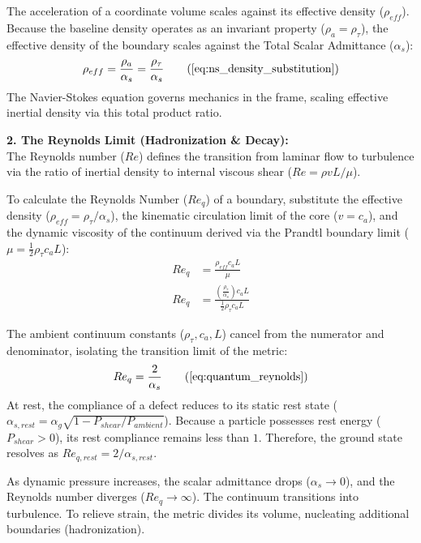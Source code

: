 The acceleration of a coordinate volume scales against its effective density ($\rho_{eff}$). Because the baseline density operates as an invariant property ($\rho_a = \rho_\tau$), the effective density of the boundary scales against the Total Scalar Admittance ($\alpha_s$): %
\begin{equation}
    \rho_{eff} = \frac{\rho_a}{\alpha_s} = \frac{\rho_{\tau}}{\alpha_s} \tag{\ref{eq:ns_density_substitution}}
\end{equation}
The Navier-Stokes equation governs mechanics in the frame, scaling effective inertial density via this total product ratio. %

\textbf{2. The Reynolds Limit (Hadronization \& Decay):} \\
The Reynolds number ($Re$) defines the transition from laminar flow to turbulence via the ratio of inertial density to internal viscous shear ($Re = \rho v L / \mu$). %

To calculate the Reynolds Number ($Re_q$) of a boundary, substitute the effective density ($\rho_{eff} = \rho_\tau/\alpha_s$), the kinematic circulation limit of the core ($v = c_a$), and the dynamic viscosity of the continuum derived via the Prandtl boundary limit ($\mu = \frac{1}{2} \rho_\tau c_a L$): %
\begin{align}
    Re_q &= \frac{\rho_{eff} c_a L}{\mu} \\ 
    Re_q &= \frac{\left( \frac{\rho_\tau}{\alpha_s} \right) c_a L}{\frac{1}{2} \rho_\tau c_a L} 
\end{align}

The ambient continuum constants ($\rho_\tau, c_a, L$) cancel from the numerator and denominator, isolating the transition limit of the metric:
\begin{equation}
    Re_q = \frac{2}{\alpha_s} \tag{\ref{eq:quantum_reynolds}} 
\end{equation}
At rest, the compliance of a defect reduces to its static rest state ($\alpha_{s, rest} = \alpha_g \sqrt{1 - P_{shear}/P_{ambient}}$). Because a particle possesses rest energy ($P_{shear} > 0$), its rest compliance remains less than $1$. Therefore, the ground state resolves as $Re_{q, rest} = 2 / \alpha_{s, rest}$. %

As dynamic pressure increases, the scalar admittance drops ($\alpha_s \to 0$), and the Reynolds number diverges ($Re_q \to \infty$). The continuum transitions into turbulence. To relieve strain, the metric divides its volume, nucleating additional boundaries (hadronization). 

